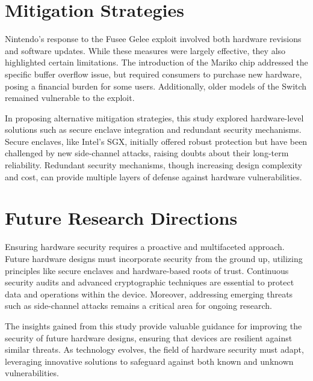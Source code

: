 \section{Mitigation Strategies}

Nintendo's response to the Fusee Gelee exploit involved both hardware revisions and software updates. While these measures were largely effective, they also highlighted certain limitations. The introduction of the Mariko chip addressed the specific buffer overflow issue, but required consumers to purchase new hardware, posing a financial burden for some users. Additionally, older models of the Switch remained vulnerable to the exploit.

In proposing alternative mitigation strategies, this study explored hardware-level solutions such as secure enclave integration and redundant security mechanisms. Secure enclaves, like Intel's SGX, initially offered robust protection but have been challenged by new side-channel attacks, raising doubts about their long-term reliability\cite{nilssonSurveyPublishedAttacks2020}. Redundant security mechanisms, though increasing design complexity and cost, can provide multiple layers of defense against hardware vulnerabilities.

\section{Future Research Directions}

Ensuring hardware security requires a proactive and multifaceted approach. Future hardware designs must incorporate security from the ground up, utilizing principles like secure enclaves and hardware-based roots of trust. Continuous security audits and advanced cryptographic techniques are essential to protect data and operations within the device. Moreover, addressing emerging threats such as side-channel attacks remains a critical area for ongoing research.

The insights gained from this study provide valuable guidance for improving the security of future hardware designs, ensuring that devices are resilient against similar threats. As technology evolves, the field of hardware security must adapt, leveraging innovative solutions to safeguard against both known and unknown vulnerabilities.